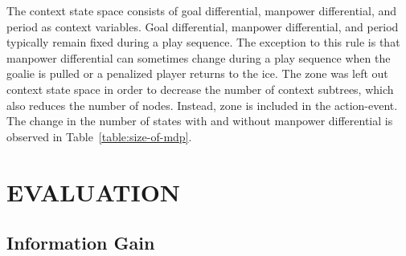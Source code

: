 \documentclass[]{article}
\begin{document}
The context state space consists of goal differential, manpower differential, and period as context variables. Goal differential, manpower differential, and period typically remain fixed during a play sequence. The exception to this rule is that manpower differential can sometimes change during a play sequence when the goalie is pulled or a penalized player returns to the ice. The zone was left out context state space in order to decrease the number of context subtrees, which also reduces the number of nodes. Instead, zone is included in the action-event. The change in the number of states with and without manpower differential is observed in Table~\ref{table:size-of-mdp}.


\section{EVALUATION}



\subsection{Information Gain}
\end{document}
